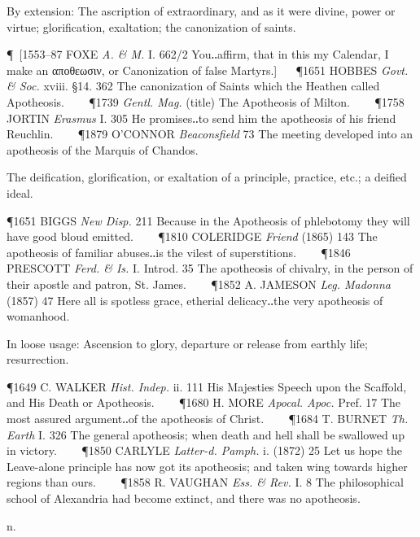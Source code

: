 \begin{description}[wide, labelwidth=!, labelindent=0pt]
\begin{myenumerate}
 By extension: The ascription of extraordinary, and as it were divine, power or virtue; glorification, exaltation; the canonization of saints.

\P [1553–87 FOXE \textit{A. \& M.} I. 662/2 You‥affirm, that in this my Calendar, I make
an αποθεωσιν, or Canonization of false Martyrs.]   
\P 1651 HOBBES  \textit{Govt. \& Soc.} xviii. §14. 362 The canonization of Saints which the Heathen called Apotheosis.    
\P 1739 \textit{Gentl. Mag.} (title) The Apotheosis of Milton.    
\P 1758 JORTIN  \textit{Erasmus} I. 305 He promises‥to send him the apotheosis of his friend Reuchlin.    
\P 1879 O'CONNOR  \textit{Beaconsfield} 73 The meeting developed into an apotheosis of the Marquis of Chandos.

 The deification, glorification, or exaltation of a principle, practice, etc.; a deified ideal.

\P 1651 BIGGS  \textit{New Disp.} 211 Because in the Apotheosis of phlebotomy they will have good bloud emitted.    
\P 1810 COLERIDGE  \textit{Friend} (1865) 143 The apotheosis of familiar abuses‥is the vilest of superstitions.    
\P 1846 PRESCOTT  \textit{Ferd. \& Is.} I. Introd. 35 The apotheosis of chivalry, in the person of their apostle and patron, St. James.    
\P 1852 A. JAMESON  \textit{Leg. Madonna} (1857) 47 Here all is spotless grace, etherial delicacy‥the very apotheosis of womanhood.

 In loose usage: Ascension to glory, departure or release from earthly life; resurrection.

\P 1649 C. WALKER  \textit{Hist. Indep.} ii. 111 His Majesties Speech upon the Scaffold, and His Death or Apotheosis.    
\P 1680 H. MORE  \textit{Apocal. Apoc.} Pref. 17 The most assured argument‥of the apotheosis of Christ.    
\P 1684 T. BURNET  \textit{Th. Earth} I. 326 The general apotheosis; when death and hell shall be swallowed up in victory.    
\P 1850 CARLYLE  \textit{Latter-d. Pamph.} i. (1872) 25 Let us hope the Leave-alone principle has now got its apotheosis; and taken wing towards higher regions than ours.    
\P 1858 R. VAUGHAN  \textit{Ess. \& Rev.} I. 8 The philosophical school of Alexandria had become extinct, and there was no apotheosis.
\end{myenumerate}


 n.

\noindent {}

\vspace{-0.3cm}


\end{description}
